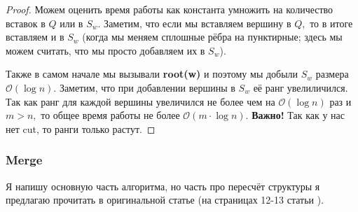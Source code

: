\begin{proof}
Можем оценить время работы как константа умножить на количество вставок в $Q$ или в $S_w.$ Заметим, что если мы вставляем вершину в $Q,$ то в итоге вставляем и в $S_w$ (когда мы меняем сплошные рёбра на пунктирные; здесь мы можем считать, что мы просто добавляем их в $S_w$). 

Также в самом начале мы вызывали \textbf{root(w)} и поэтому мы добыли $S_w$ размера $\mathcal{O}(\log{n}).$ Заметим, что при добавлении вершины в $S_w$ её ранг увелиличился. Так как ранг для каждой вершины увеличился не более чем на $\mathcal{O}(\log{n})$ раз и $m > n,$ то общее время работы не более $\mathcal{O}(m\cdot\log{n}).$ \textbf{Важно!} Так как у нас нет cut, то ранги только растут.
\end{proof}

\subsubsection{Merge}
Я напишу основную часть алгоритма, но часть про пересчёт структуры я предлагаю прочитать в оригинальной статье (на страницах 12-13 статьи \cite{georgiadis2011data}).

